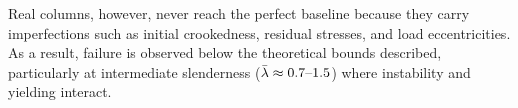Real columns, however, never reach the perfect baseline because they carry imperfections such as initial crookedness, residual stresses, and load eccentricities. As a result, failure is observed below the theoretical bounds described, particularly at intermediate slenderness ($\bar{\lambda} \approx 0.7\text{--}1.5$) where instability and yielding interact.

